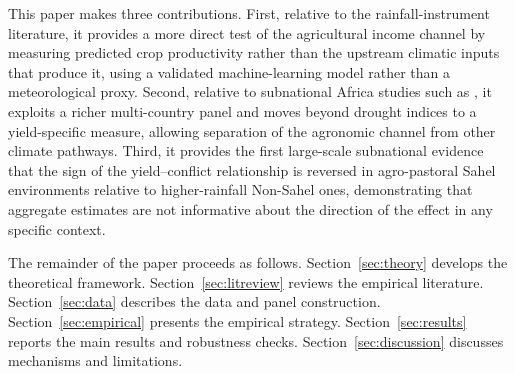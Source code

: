 This paper makes three contributions. First, relative to the rainfall-instrument literature, it provides a more direct test of the agricultural income channel by measuring predicted crop productivity rather than the upstream climatic inputs that produce it, using a validated machine-learning model rather than a meteorological proxy. Second, relative to subnational Africa studies such as \citet{HarariLaFerrara2018}, it exploits a richer multi-country panel and moves beyond drought indices to a yield-specific measure, allowing separation of the agronomic channel from other climate pathways. Third, it provides the first large-scale subnational evidence that the sign of the yield--conflict relationship is reversed in agro-pastoral Sahel environments relative to higher-rainfall Non-Sahel ones, demonstrating that aggregate estimates are not informative about the direction of the effect in any specific context.

The remainder of the paper proceeds as follows. Section~\ref{sec:theory} develops the theoretical framework. Section~\ref{sec:litreview} reviews the empirical literature. Section~\ref{sec:data} describes the data and panel construction. Section~\ref{sec:empirical} presents the empirical strategy. Section~\ref{sec:results} reports the main results and robustness checks. Section~\ref{sec:discussion} discusses mechanisms and limitations.
